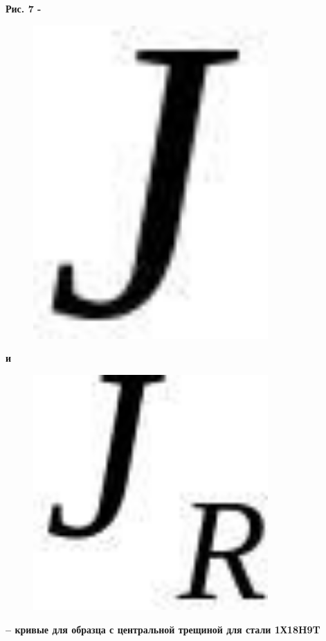 {\bfseries Рис. 7 -} \begin{figure}[H]
	\centering
	\includegraphics[width=0.8\textwidth]{assets/1205}
	\caption*{}
\end{figure} {\bfseries и}
\begin{figure}[H]
	\centering
	\includegraphics[width=0.8\textwidth]{assets/1206}
	\caption*{}
\end{figure} {\bfseries -- кривые для образца с
центральной трещиной для стали 1Х18H9T}

